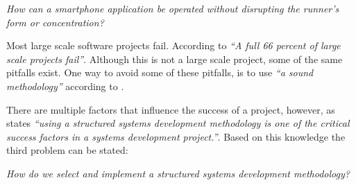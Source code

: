 \begin{center}
\textit{How can a smartphone application be operated without disrupting the runner's form or concentration?}
\end{center}
\pagebreak


\noindent Most large scale software projects fail. According to \citet{gartner:failure} \textit{``A full 66 percent of large scale projects fail”}.
Although this is not a large scale project, some of the same pitfalls exist.
One way to avoid some of these pitfalls, is to use \textit{``a sound methodology”} according to \citet{dorsey:methodologyReason}.

There are multiple factors that influence the success of a project, however, as \citet{dorsey:methodologyReason} states \textit{``using a structured systems development methodology is one of the critical success factors in a	systems development project.”}.
Based on this knowledge the third problem can be stated:

\begin{center}
	\textit{How do we select and implement a structured systems development methodology?}
\end{center}